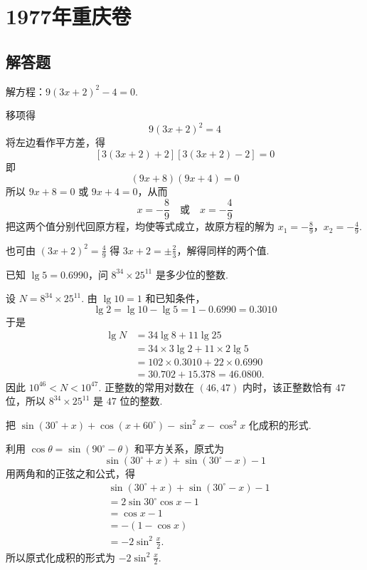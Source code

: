 \chapter{1977年重庆卷}

\section{解答题}

\begin{problem}
解方程：\(9\left(3x+2\right)^2-4=0\).
\end{problem}

\begin{solution}
移项得
\[
9\left(3x+2\right)^2=4
\]
将左边看作平方差，得
\[
\left[3\left(3x+2\right)+2\right]\left[3\left(3x+2\right)-2\right]=0
\]
即
\[
\left(9x+8\right)\left(9x+4\right)=0
\]
所以 \(9x+8=0\) 或 \(9x+4=0\)，从而
\[
x=-\frac{8}{9}\quad\text{或}\quad x=-\frac{4}{9}
\]
把这两个值分别代回原方程，均使等式成立，故原方程的解为
\(x_1=-\frac{8}{9}\)，\(x_2=-\frac{4}{9}\).

也可由 \(\left(3x+2\right)^2=\frac49\) 得
\(3x+2=\pm\frac23\)，解得同样的两个值.
\end{solution}

\begin{problem}
已知 \(\lg5=0.6990\)，问 \(8^{34}\times25^{11}\) 是多少位的整数.
\end{problem}

\begin{solution}
设 \(N=8^{34}\times25^{11}\). 由 \(\lg10=1\) 和已知条件，
\[
\lg2=\lg10-\lg5=1-0.6990=0.3010
\]
于是
\[
\begin{aligned}
\lg N
&=34\lg8+11\lg25\\
&=34\times3\lg2+11\times2\lg5\\
&=102\times0.3010+22\times0.6990\\
&=30.702+15.378=46.0800.
\end{aligned}
\]
因此 \(10^{46}<N<10^{47}\). 正整数的常用对数在 \((46,47)\) 内时，该正整数恰有 \(47\) 位，所以 \(8^{34}\times25^{11}\) 是 \(47\) 位的整数.
\end{solution}

\begin{problem}
把 \(\sin\left(30^\circ+x\right)+\cos\left(x+60^\circ\right)-\sin^2x-\cos^2x\) 化成积的形式.
\end{problem}

\begin{solution}
利用 \(\cos\theta=\sin\left(90^\circ-\theta\right)\) 和平方关系，原式为
\[
\sin\left(30^\circ+x\right)+\sin\left(30^\circ-x\right)-1
\]
用两角和的正弦之和公式，得
\[
\begin{aligned}
&\sin\left(30^\circ+x\right)+\sin\left(30^\circ-x\right)-1\\
&=2\sin30^\circ\cos x-1\\
&=\cos x-1\\
&=-\left(1-\cos x\right)\\
&=-2\sin^2\frac{x}{2}.
\end{aligned}
\]
所以原式化成积的形式为 \(-2\sin^2\frac{x}{2}\).
\end{solution}

